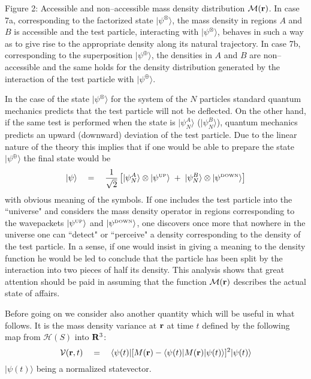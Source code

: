 \documentclass[10pt,a4paper]{article}
\begin{document}
\begin{center}
\vspace{0.2cm} \footnotesize \parbox{4.8in}{Figure 2: Accessible
and non--accessible mass density distribution ${\mathcal M}({\bf
r})$. In case 7a, corresponding to the factorized state
$|\psi^{\otimes}\rangle$, the mass density in regions $A$ and $B$
is accessible and the test particle, interacting with
$|\psi^{\otimes}\rangle$, behaves in such a way as to give rise to
the appropriate density along its natural trajectory. In case 7b,
corresponding to the superposition $|\psi^{\oplus}\rangle$, the
densities in $A$ and $B$ are non--accessible and the same holds
for the density distribution generated by the interaction of the
test particle with $|\psi^{\oplus}\rangle$.} \normalsize
\end{center} \vspace{0.5cm}
In the case of the state $|\psi^{\otimes}\rangle$  for the system
of the $N$ particles  standard quantum mechanics predicts that the test
particle will not be deflected. On the other hand, if the same
test is performed when the state is $|\psi^{A}_{N}\rangle$
($|\psi^{B}_{N}\rangle$), quantum mechanics predicts an upward
(downward) deviation of the test particle. Due to the linear
nature of the theory this implies that if one would be able to
prepare the state  $|\psi^{\oplus}\rangle$ the final state would
be
\begin{equation} \label{edcvf}
|\psi\rangle \quad = \quad \frac{1}{\sqrt{2}} \left[
|\psi^{A}_{N}\rangle \otimes |\psi^{\makebox{\tiny UP}}\rangle \;
+ \; |\psi^{B}_{N}\rangle \otimes |\psi^{\makebox{\tiny
DOWN}}\rangle \right]
\end{equation}
with obvious meaning of the symbols. If one includes the test
particle into the ``universe" and considers the mass density
operator in regions corresponding to the wavepackets
$|\psi^{\makebox{\tiny UP}}\rangle$  and $|\psi^{\makebox{\tiny
DOWN}}\rangle$, one discovers once more that nowhere in the
universe one can ``detect" or ``perceive" a density corresponding
to the density of the test particle. In a sense, if one would
insist in giving a meaning to the density function he would be led
to conclude that the particle has been split by the interaction
into two pieces of half its density. This analysis shows that
great attention should be paid in assuming that the function
${\mathcal M}({\bf r})$ describes the actual state of affairs.

Before going on we consider also another quantity which will be
useful in what follows. It is the mass density variance at ${\bf
r}$ at time $t$ defined by the following map from ${\mathcal
H}(S)$ into ${\bf R}^{3}$:
\begin{equation}
{\mathcal V}({\bf r}, t) \quad = \quad \langle \psi(t)|[ M({\bf
r}) - \langle \psi(t)| M({\bf r}) | \psi(t) \rangle]^{2}
|\psi(t)\rangle
\end{equation}
$|\psi(t)\rangle$ being a normalized statevector.
\end{document}
